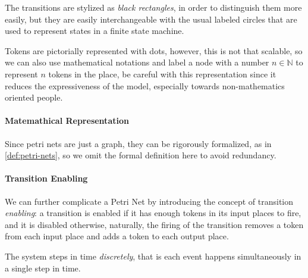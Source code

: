 \documentclass[openright, twoside, twocolumn]{report}
\begin{document}
    The transitions are stylized as \emph{black rectangles}, in order to distinguish them more easily, but they are easily interchangeable 
    with the usual labeled circles that are used to represent states in a finite state machine.

    Tokens are pictorially represented with dots, however, this is not that scalable, so we can also use mathematical 
    notations and label a node with a number $n \in \mathbb{N}$ to represent $n$ tokens in the place, be careful with 
    this representation since it reduces the expressiveness of the model, especially towards non-mathematics oriented 
    people.


    \paragraph{Matemathical Representation}
    Since petri nets are just a graph, they can be rigorously formalized, as in \cref{def:petri-nets}, so we omit 
    the formal definition here to avoid redundancy. 

    \paragraph{Transition Enabling} 
    
    We can further complicate a Petri Net by introducing the concept of transition \emph{enabling}: a transition 
    is enabled if it has enough tokens in its input places to fire, and it is disabled otherwise, naturally, 
    the firing of the transition removes a token from each input place and adds a token to each output place.

    The system steps in time \emph{discretely}, that is each event happens simultaneously in a single step in 
    time.
\end{document}
